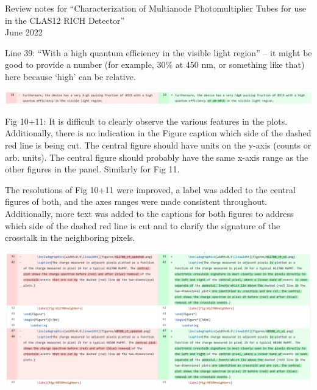 \documentclass[11pt]{report}
\begin{document}
 

{\LARGE\centering
Review notes for “Characterization of Multianode Photomultiplier Tubes for use in the CLAS12 RICH Detector”\\[1cm]

June 2022\\[1cm]
}

\begin{tcolorbox}[enlarge top by=2em,colbacktitle=black!60!white,colframe=black!80!white,left=0pt,right=0pt,top=0pt,bottom=0pt,boxrule=0.3pt,title=\bfseries1.01]
Line 39: “With a high quantum efficiency in the visible light region” – it might be good to provide a number (for example, 30\% at 450 nm, or something like that) here because ‘high’ can be relative.
\end{tcolorbox}


\includegraphics[width=\linewidth]{round1/1.01.png}

\begin{tcolorbox}[enlarge top by=2em,colbacktitle=black!60!white,colframe=black!80!white,left=0pt,right=0pt,top=0pt,bottom=0pt,boxrule=0.3pt,title=\bfseries1.02]
Fig  10+11:  It  is  difficult  to  clearly  observe  the  various  features  in  the  plots.   Additionally,  there  is no indication in the Figure caption which side of the dashed red line is being cut.  The central figure should have units on the y-axis (counts or arb.  units).  The central figure should probably have the same x-axis range as the other figures in the panel.  Similarly for Fig 11.
\end{tcolorbox}

The resolutions of Fig 10+11 were improved, a label was added to the central figures of both, and the axes ranges were made consistent throughout. Additionally, more text was added to the captions for both figures to address which side of the dashed red line is cut and to clarify the signature of the crosstalk in the neighboring pixels.


\includegraphics[width=\linewidth]{round1/1.02.png}
\end{document}
